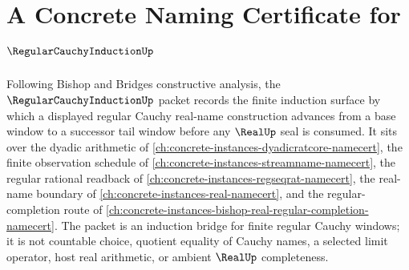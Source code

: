 \chapter{A Concrete Naming Certificate for $\RegularCauchyInductionUp$}
\label{ch:concrete-instances-regular-cauchy-induction-namecert}

Following Bishop and Bridges constructive analysis, the $\RegularCauchyInductionUp$ packet records the finite induction surface by which a displayed regular Cauchy real-name construction advances from a base window to a successor tail window before any $\RealUp$ seal is consumed. It sits over the dyadic arithmetic of \autoref{ch:concrete-instances-dyadicratcore-namecert}, the finite observation schedule of \autoref{ch:concrete-instances-streamname-namecert}, the regular rational readback of \autoref{ch:concrete-instances-regseqrat-namecert}, the real-name boundary of \autoref{ch:concrete-instances-real-namecert}, and the regular-completion route of \autoref{ch:concrete-instances-bishop-real-regular-completion-namecert}. The packet is an induction bridge for finite regular Cauchy windows; it is not countable choice, quotient equality of Cauchy names, a selected limit operator, host real arithmetic, or ambient $\RealUp$ completeness.

